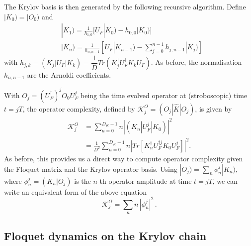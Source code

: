 \documentclass[a4paper,12pt]{article}
\begin{document}
The Krylov basis is then generated by the following recursive algorithm. Define $|K_0)=|O_0)$ and
\begin{align}  
&|K_1)=\frac{1}{h_{1,0}}\big[ U_F|K_0)-h_{0,0}|K_0) \big] \\ 
&|K_n)=\frac{1}{h_{n,n-1}}\left[ U_F |K_{n-1})-\sum_{j=0}^ {n-1}h_{j,n-1}|K_j) \right] \label{Kn}
\end{align}  
with
  $h_{j,k}=(K_j|U_F|K_k)=\dfrac{1}{D}Tr(K_j^{\dagger} U_F^{\dagger}K_{k}U_F )$. As before, the normalisation $h_{n,n-1}$ are the Arnoldi coefficients.

With $O_j=(U_F^{\dagger})^j O_0U_F^ j$ being the time evolved operator at (stroboscopic) time $t=jT$, the operator complexity, defined by $\mathcal{K}_j^{O}=(O_j|\hat{K}|O_j)$, is given by
\begin{align}\label{KCFdefn}
\mathcal{K}_j^{O}&=\sum_{n=0}^{D_K-1} n |(K_n|U_F^ j|K_0)|^2 \nonumber\\
&= \frac{1}{D^ 2}\sum_{n=0}^{D_K-1} n |Tr[K_n^{\dagger} U_F^{\dagger j} K_0 U_F^j]|^2.
\end{align}
As before, this provides us a direct way to compute operator complexity given the Floquet matrix and the Krylov operator basis.
Using $|O_{j})=\sum_n \phi_n^j |K_n)$, where $\phi_n^j=(K_n|O_j)$ is the $n$-th operator amplitude at time $t=j T$, we can write an equivalent form of the above equation
\begin{equation}\label{KCFdefn2}
\mathcal{K}_j^{O}=\sum_n  n \, |\phi_n^j|^2\,.
\end{equation}

\subsection{Floquet dynamics on the Krylov chain}
\end{document}
